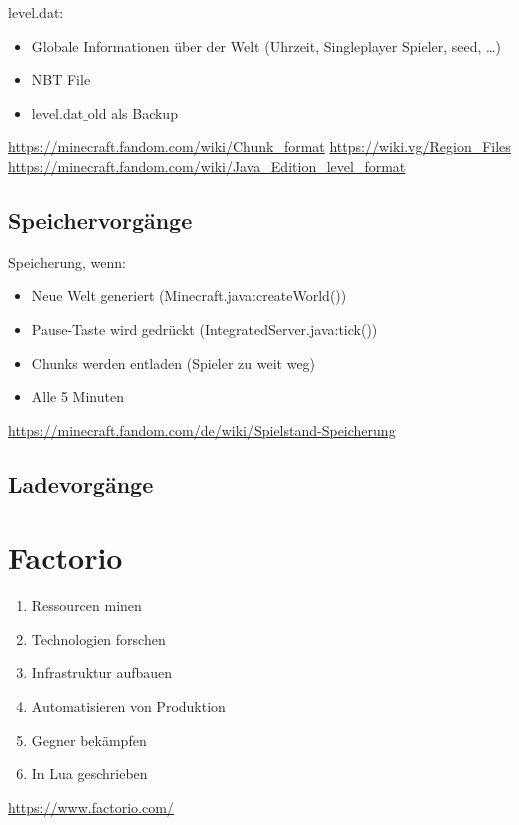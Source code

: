 level.dat:
\begin{itemize}
    \item Globale Informationen über der Welt (Uhrzeit, Singleplayer Spieler, seed, \dots)
    \item NBT File
    \item level.dat$\_$old als Backup
\end{itemize}

\url{https://minecraft.fandom.com/wiki/Chunk_format}
\url{https://wiki.vg/Region_Files}
\url{https://minecraft.fandom.com/wiki/Java_Edition_level_format}

\subsection{Speichervorgänge}

Speicherung, wenn:
\begin{itemize}
    \item Neue Welt generiert (Minecraft.java:createWorld())
    \item Pause-Taste wird gedrückt (IntegratedServer.java:tick())
    \item Chunks werden entladen (Spieler zu weit weg)
    \item Alle 5 Minuten
\end{itemize}

\url{https://minecraft.fandom.com/de/wiki/Spielstand-Speicherung}

\subsection{Ladevorgänge}



\section{Factorio}
\begin{enumerate}
    \item Ressourcen minen 
    \item Technologien forschen
    \item Infrastruktur aufbauen
    \item Automatisieren von Produktion
    \item Gegner bekämpfen
    \item In Lua geschrieben
\end{enumerate}
\url{https://www.factorio.com/}

